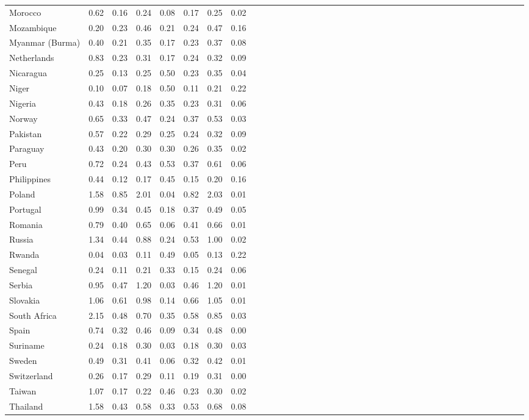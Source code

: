 \begin{ThreePartTable}
\begin{longtable}[t]{l|r|rrrl|r|rrrl|r|rrrl|r|rrrl|r|rrrl|r|rrrl|r|rrrl|r|rrr}
Morocco & 0.62 & 0.16 & 0.24 & 0.08 & 0.17 & 0.25 & 0.02\\
Mozambique & 0.20 & 0.23 & 0.46 & 0.21 & 0.24 & 0.47 & 0.16\\
Myanmar (Burma) & 0.40 & 0.21 & 0.35 & 0.17 & 0.23 & 0.37 & 0.08\\
Netherlands & 0.83 & 0.23 & 0.31 & 0.17 & 0.24 & 0.32 & 0.09\\
Nicaragua & 0.25 & 0.13 & 0.25 & 0.50 & 0.23 & 0.35 & 0.04\\
Niger & 0.10 & 0.07 & 0.18 & 0.50 & 0.11 & 0.21 & 0.22\\
Nigeria & 0.43 & 0.18 & 0.26 & 0.35 & 0.23 & 0.31 & 0.06\\
Norway & 0.65 & 0.33 & 0.47 & 0.24 & 0.37 & 0.53 & 0.03\\
Pakistan & 0.57 & 0.22 & 0.29 & 0.25 & 0.24 & 0.32 & 0.09\\
Paraguay & 0.43 & 0.20 & 0.30 & 0.30 & 0.26 & 0.35 & 0.02\\
Peru & 0.72 & 0.24 & 0.43 & 0.53 & 0.37 & 0.61 & 0.06\\
Philippines & 0.44 & 0.12 & 0.17 & 0.45 & 0.15 & 0.20 & 0.16\\
Poland & 1.58 & 0.85 & 2.01 & 0.04 & 0.82 & 2.03 & 0.01\\
Portugal & 0.99 & 0.34 & 0.45 & 0.18 & 0.37 & 0.49 & 0.05\\
Romania & 0.79 & 0.40 & 0.65 & 0.06 & 0.41 & 0.66 & 0.01\\
Russia & 1.34 & 0.44 & 0.88 & 0.24 & 0.53 & 1.00 & 0.02\\
Rwanda & 0.04 & 0.03 & 0.11 & 0.49 & 0.05 & 0.13 & 0.22\\
Senegal & 0.24 & 0.11 & 0.21 & 0.33 & 0.15 & 0.24 & 0.06\\
Serbia & 0.95 & 0.47 & 1.20 & 0.03 & 0.46 & 1.20 & 0.01\\
Slovakia & 1.06 & 0.61 & 0.98 & 0.14 & 0.66 & 1.05 & 0.01\\
South Africa & 2.15 & 0.48 & 0.70 & 0.35 & 0.58 & 0.85 & 0.03\\
Spain & 0.74 & 0.32 & 0.46 & 0.09 & 0.34 & 0.48 & 0.00\\
Suriname & 0.24 & 0.18 & 0.30 & 0.03 & 0.18 & 0.30 & 0.03\\
Sweden & 0.49 & 0.31 & 0.41 & 0.06 & 0.32 & 0.42 & 0.01\\
Switzerland & 0.26 & 0.17 & 0.29 & 0.11 & 0.19 & 0.31 & 0.00\\
Taiwan & 1.07 & 0.17 & 0.22 & 0.46 & 0.23 & 0.30 & 0.02\\
Thailand & 1.58 & 0.43 & 0.58 & 0.33 & 0.53 & 0.68 & 0.08\\

\end{longtable}
\end{ThreePartTable}
